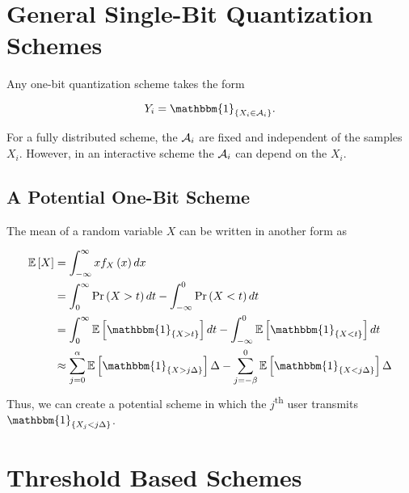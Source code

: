 \documentclass[twoside]{article}
\begin{document}



\section{General Single-Bit Quantization Schemes}

Any one-bit quantization scheme takes the form

\begin{equation}
    Y_i = \mathbbm{1}_{\cbrak{X_i \in \cA_i}}.
    \label{eq:one-bit-gen}
\end{equation}

For a fully distributed scheme, the \(\mathcal A_i\) are fixed and independent of the
samples \(X_i\). However, in an interactive scheme the \(\mathcal A_i\) can depend on
the \(X_i\).

\subsection{A Potential One-Bit Scheme}
The mean of a random variable \(X\) can be written in another form as

\begin{align}
    \mean{X} &= \int_{-\infty}^{\infty}xf_X\brak{x}dx \\
             &= \int_{0}^{\infty}\pr{X>t}dt - \int_{-\infty}^0\pr{X<t}dt \\
             &= \int_{0}^{\infty}\mean{\mathbbm{1}_{\cbrak{X>t}}}dt - \int_{-\infty}^0\mean{\mathbbm{1}_{\cbrak{X<t}}}dt \\
             &\approx \sum_{j=0}^{\alpha}\mean{\mathbbm{1}_{\cbrak{X > j\Delta}}}\Delta - \sum_{j=-\beta}^{0}\mean{\mathbbm{1}_{\cbrak{X < j\Delta}}}\Delta
             \label{eq:X-mean-alt}
\end{align}
Thus, we can create a potential scheme in which the \(j\)\textsuperscript{th} user
transmits \(\mathbbm{1}_{\cbrak{X_j < j\Delta}}\).

\section{Threshold Based Schemes}
\end{document}
